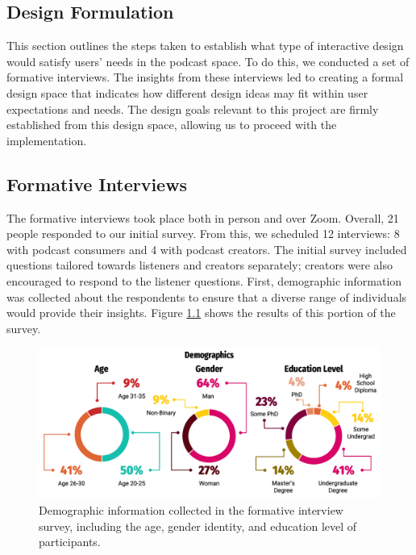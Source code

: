 \documentclass[12pt]{report}
\begin{document}
\begin{myfont}
        \chapter{Design Formulation}
        This section outlines the steps taken to establish what type of interactive design would satisfy users' needs in the podcast space. To do this, we conducted a set of formative interviews. The insights from these interviews led to creating a formal design space that indicates how different design ideas may fit within user expectations and needs. The design goals relevant to this project are firmly established from this design space, allowing us to proceed with the implementation.
        
        \section{Formative Interviews}
        The formative interviews took place both in person and over Zoom. Overall, 21 people responded to our initial survey. From this, we scheduled 12 interviews: 8 with podcast consumers and 4 with podcast creators. The initial survey included questions tailored towards listeners and creators separately; creators were also encouraged to respond to the listener questions. First, demographic information was collected about the respondents to ensure that a diverse range of individuals would provide their insights. Figure \ref{fig:demographics} shows the results of this portion of the survey. 
        \begin{figure}[H]
        \centering
          \includegraphics[width=1\textwidth]{figures/formative_demographics.png}
          \caption{Demographic information collected in the formative interview survey, including the age, gender identity, and education level of participants.}
          \label{fig:demographics}
        \end{figure}

\end{myfont}
\end{document}
